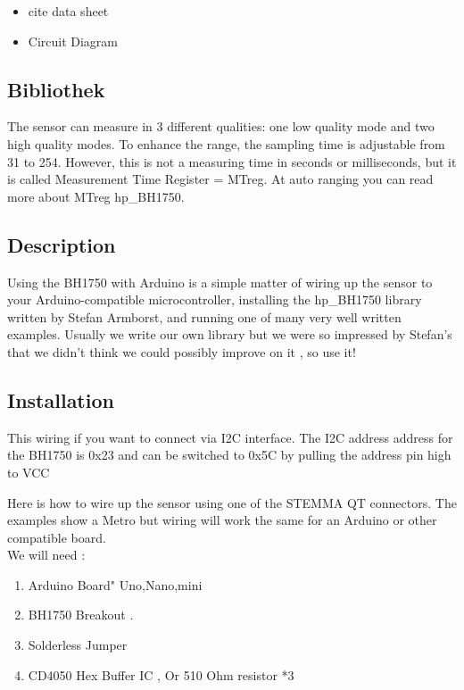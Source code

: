 \begin{itemize}
	\item cite data sheet
	\item Circuit Diagram
\end{itemize}

\subsection{Bibliothek}

The sensor can measure in 3 different qualities: one low quality mode and two high quality modes.
To enhance the range, the sampling time is adjustable from 31 to 254.
However, this is not a measuring time in seconds or milliseconds, but it is called Measurement Time Register = MTreg. At auto ranging you can read more about \cite{Xiangyan:2020} MTreg hp_BH1750.



\subsection{Description}
Using the BH1750 with Arduino is a simple matter of wiring up the sensor to your Arduino-compatible microcontroller, installing the hp_BH1750 library written by Stefan Armborst, and running one of many very well written examples. Usually we write our own library but we were so impressed by Stefan's that we didn't think we could possibly improve on it \cite{Muhammad:2020} , so use it!

\subsection{Installation}
This wiring if you want to connect via I2C interface. The I2C address address for the BH1750 is 0x23 and can be switched to 0x5C by pulling the address pin high to VCC

Here is how to wire up the sensor using one of the STEMMA QT connectors. The examples show a Metro but wiring will work the same for an Arduino or other compatible board.
\\
We will need :

\begin{enumerate}
	\item Arduino Board" Uno,Nano,mini 
	\item BH1750 Breakout .
	\item Solderless Jumper
	\item CD4050 Hex Buffer IC , Or 510 Ohm resistor *3
\end{enumerate}

